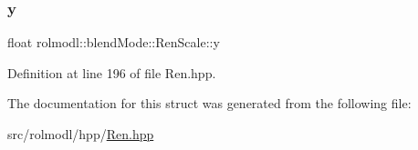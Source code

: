 \subsubsection{\texorpdfstring{y}{y}}
{\footnotesize\ttfamily float rolmodl\+::blend\+Mode\+::\+Ren\+Scale\+::y}



Definition at line 196 of file Ren.\+hpp.



The documentation for this struct was generated from the following file\+:\begin{DoxyCompactItemize}
\item 
src/rolmodl/hpp/\mbox{\hyperlink{_ren_8hpp}{Ren.\+hpp}}\end{DoxyCompactItemize}
